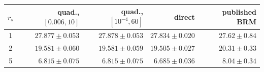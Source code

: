 \begin{tabular}{crrrr}
\toprule
$r_s$ & quad., $[0.006,10]$ & quad., $[10^{-4},60]$ & direct & published BRM\\
\midrule
1 & $27.877\pm0.053$ & $27.878\pm0.053$ & $27.834\pm0.020$ & $27.62\pm0.84$\\
2 & $19.581\pm0.060$ & $19.581\pm0.059$ & $19.505\pm0.027$ & $20.31\pm0.33$\\
5 & $6.815\pm0.075$ & $6.815\pm0.075$ & $6.685\pm0.036$ & $8.04\pm0.34$\\
\bottomrule
\end{tabular}
